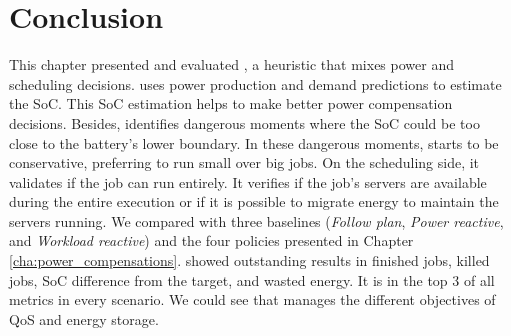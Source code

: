 \section{Conclusion}

This chapter presented and evaluated \emph{\systemName}, a heuristic that mixes power and scheduling decisions. \emph{\systemName} uses power production and demand predictions to estimate the SoC. This SoC estimation helps to make better power compensation decisions. Besides, \emph{\systemName} identifies dangerous moments where the SoC could be too close to the battery's lower boundary. In these dangerous moments, \emph{\systemName} starts to be conservative, preferring to run small over big jobs. On the scheduling side, it validates if the job can run entirely. It verifies if the job's servers are available during the entire execution or if it is possible to migrate energy to maintain the servers running. We compared \emph{\systemName} with three baselines (\emph{Follow plan}, \emph{Power reactive}, and \emph{Workload reactive}) and the four policies presented in Chapter \ref{cha:power_compensations}. \emph{\systemName} showed outstanding results in finished jobs, killed jobs, SoC difference from the target, and wasted energy. It is in the top 3 of all metrics in every scenario. We could see that \emph{\systemName} manages the different objectives of QoS and energy storage.